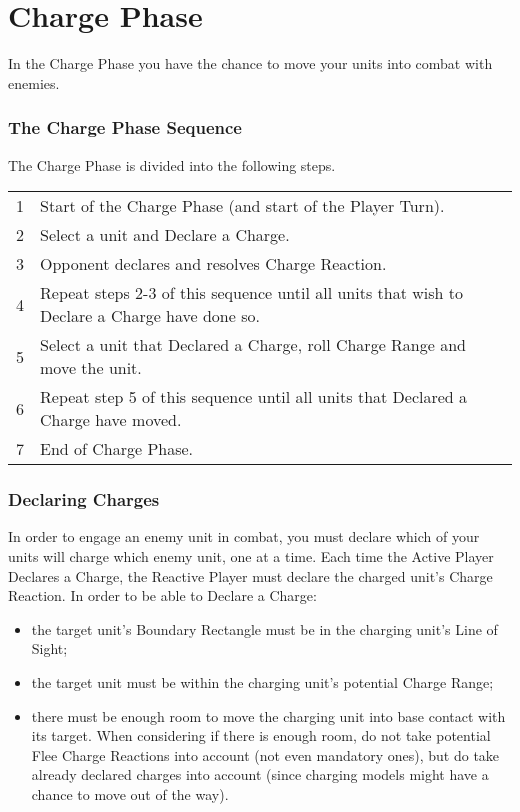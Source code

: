 
\part{Charge Phase}
\label{charge_phase}

In the Charge Phase you have the chance to move your units into combat with enemies.

\section{The Charge Phase Sequence}
\label{the_charge_phase_sequence}

The Charge Phase is divided into the following steps.

\hspace*{0.3cm}
\begin{tabular}{c|p{14cm}}
1 & Start of the Charge Phase (and start of the Player Turn). \tabularnewline
2 & Select a unit and Declare a Charge. \tabularnewline
3 & Opponent declares and resolves Charge Reaction. \tabularnewline
4 & Repeat steps 2-3 of this sequence until all units that wish to Declare a Charge have done so. \tabularnewline
5 & Select a unit that Declared a Charge, roll Charge Range and move the unit. \tabularnewline
6 & Repeat step 5 of this sequence until all units that Declared a Charge have moved. \tabularnewline
7 & End of Charge Phase. \tabularnewline
\end{tabular}

\section{Declaring Charges}
\label{declaring_charges}

In order to engage an enemy unit in combat, you must declare which of your units will charge which enemy unit, one at a time. Each time the Active Player Declares a Charge, the Reactive Player must declare the charged unit's Charge Reaction. In order to be able to Declare a Charge:

\begin{itemize}[label={-}]
\item the target unit's Boundary Rectangle must be in the charging unit's Line of Sight;
\item the target unit must be within the charging unit's potential Charge Range;
\item there must be enough room to move the charging unit into base contact with its target. When considering if there is enough room, do not take potential Flee Charge Reactions into account (not even mandatory ones), but do take already declared charges into account (since charging models might have a chance to move out of the way).
\end{itemize}

